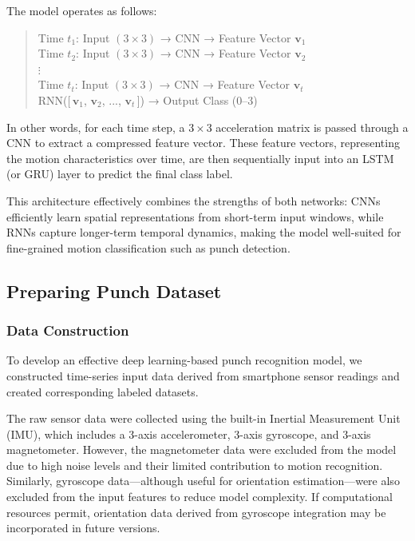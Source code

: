 \documentclass{article}
\begin{document}
The model operates as follows:

\begin{quote}
\begin{center}
Time $t_1$: Input $(3 \times 3)$ → CNN → Feature Vector $\mathbf{v}_1$ \\
Time $t_2$: Input $(3 \times 3)$ → CNN → Feature Vector $\mathbf{v}_2$ \\
\quad$\vdots$ \\
Time $t_t$: Input $(3 \times 3)$ → CNN → Feature Vector $\mathbf{v}_t$ \\[1ex]

RNN([\,$\mathbf{v}_1$, $\mathbf{v}_2$, ..., $\mathbf{v}_t$\,]) → Output Class (0--3)
\end{center}
\end{quote}

In other words, for each time step, a $3 \times 3$ acceleration matrix is passed through a CNN to extract a compressed feature vector. These feature vectors, representing the motion characteristics over time, are then sequentially input into an LSTM (or GRU) layer to predict the final class label.

This architecture effectively combines the strengths of both networks: CNNs efficiently learn spatial representations from short-term input windows, while RNNs capture longer-term temporal dynamics, making the model well-suited for fine-grained motion classification such as punch detection.







\subsection{Preparing Punch Dataset}

\subsubsection{Data Construction}

To develop an effective deep learning-based punch recognition model, we constructed time-series input data derived from smartphone sensor readings and created corresponding labeled datasets.

The raw sensor data were collected using the built-in Inertial Measurement Unit (IMU), which includes a 3-axis accelerometer, 3-axis gyroscope, and 3-axis magnetometer. However, the magnetometer data were excluded from the model due to high noise levels and their limited contribution to motion recognition. Similarly, gyroscope data—although useful for orientation estimation—were also excluded from the input features to reduce model complexity. If computational resources permit, orientation data derived from gyroscope integration may be incorporated in future versions.
\end{document}
